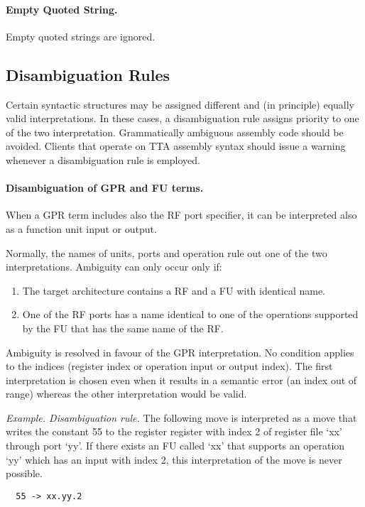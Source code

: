 \documentclass[twoside]{tceusermanual}
\begin{document}
\paragraph{Empty Quoted String.}
Empty quoted strings are ignored.

\subsection{Disambiguation Rules}

Certain syntactic structures may be assigned different and (in principle)
equally valid interpretations. In these cases, a disambiguation rule assigns
priority to one of the two interpretation.
%
Grammatically ambiguous assembly code should be avoided.  Clients that
operate on TTA assembly syntax should issue a warning whenever a
disambiguation rule is employed.

\paragraph{Disambiguation of GPR and FU terms.}
When a GPR term includes also the RF port specifier, it can be interpreted
also as a function unit input or output.

Normally, the names of units, ports and operation rule out one of the two
interpretations.  Ambiguity can only occur only if:
\begin{enumerate}
\item%
  The target architecture contains a RF and a FU with identical name.
\item%
  One of the RF ports has a name identical to one of the operations
  supported by the FU that has the same name of the RF.
%
\end{enumerate}

Ambiguity is resolved in favour of the GPR interpretation. No condition
applies to the indices (register index or operation input or output index).
The first interpretation is chosen even when it results in a semantic error
(an index out of range) whereas the other interpretation would be valid.

\emph{Example. Disambiguation rule.} The following move is interpreted as a
move that writes the constant 55 to the register register with index 2 of
register file `xx' through port `yy'.  If there exists an FU called `xx'
that supports an operation `yy' which has an input with index 2, this
interpretation of the move is never possible.
\begin{verbatim}
  55 -> xx.yy.2
\end{verbatim}
\end{document}

